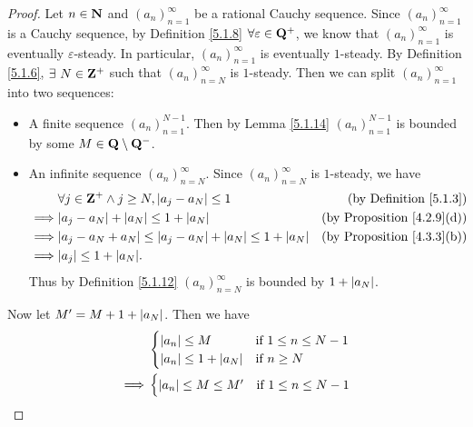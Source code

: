 \begin{proof}
    Let \(n \in \mathbf{N}\) and \((a_n)_{n = 1}^{\infty}\) be a rational Cauchy sequence.
    Since \((a_n)_{n = 1}^{\infty}\) is a Cauchy sequence, by Definition \ref{5.1.8} \(\forall \varepsilon \in \mathbf{Q}^+\), we know that \((a_n)_{n = 1}^{\infty}\) is eventually \(\varepsilon\)-steady.
    In particular, \((a_n)_{n = 1}^{\infty}\) is eventually \(1\)-steady.
    By Definition \ref{5.1.6}, \(\exists\ N \in \Z^+\) such that \((a_n)_{n = N}^{\infty}\) is \(1\)-steady.
    Then we can split \((a_n)_{n = 1}^{\infty}\) into two sequences:
    \begin{itemize}
        \item A finite sequence \((a_n)_{n = 1}^{N - 1}\).
              Then by Lemma \ref{5.1.14} \((a_n)_{n = 1}^{N - 1}\) is bounded by some \(M \in \mathbf{Q} \setminus \mathbf{Q}^-\).
        \item An infinite sequence \((a_n)_{n = N}^{\infty}\).
              Since \((a_n)_{n = N}^\infty\) is \(1\)-steady, we have
              \begin{align*}
                           & \forall j \in \Z^+ \land j \geq N, \abs{a_j - a_N} \leq 1                 & \text{(by Definition \ref{5.1.3})}     \\
                  \implies & \abs{a_j - a_N} + \abs{a_N} \leq 1 + \abs{a_N}                            & \text{(by Proposition \ref{4.2.9}(d))} \\
                  \implies & \abs{a_j - a_N + a_N} \leq \abs{a_j - a_N} + \abs{a_N} \leq 1 + \abs{a_N} & \text{(by Proposition \ref{4.3.3}(b))} \\
                  \implies & \abs{a_j} \leq 1 + \abs{a_N}.
              \end{align*}
              Thus by Definition \ref{5.1.12} \((a_n)_{n = N}^\infty\) is bounded by \(1 + \left\lvert a_N\right\rvert\).
    \end{itemize}
    Now let \(M' = M + 1 + \left\lvert a_N\right\rvert\).
    Then we have
    \begin{align*}
                 & \begin{cases}
                       \left\lvert a_n\right\rvert \leq M             & \text{if } 1 \leq n \leq N - 1 \\
                       \left\lvert a_n\right\rvert \leq 1 + \left\lvert a_N\right\rvert & \text{if } n \geq N
                   \end{cases}                                                  \\
        \implies & \begin{cases}
                       \left\lvert a_n\right\rvert \leq M \leq M'             & \text{if } 1 \leq n \leq N - 1 \\

\end{cases}
\end{align*}
\end{proof}
